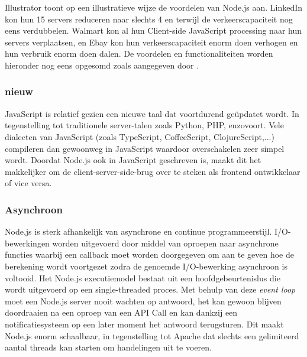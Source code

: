 Illustrator \textcite{Mehmet2016} toont op een illustratieve wijze de voordelen van Node.js aan. LinkedIn kon hun 15 servers reduceren naar slechts 4 en terwijl de verkeerscapaciteit nog eens verdubbelen. Walmart kon al hun Client-side JavaScript processing naar hun servers verplaatsen, en Ebay kon hun verkeerscapaciteit enorm doen verhogen en hun verbruik enorm doen dalen. De voordelen en functionaliteiten worden hieronder nog eens opgesomd zoals aangegeven door \textcite{Chandrayan2017}.

\subsubsection{nieuw}
\label{sec:new}

JavaScript is relatief gezien een nieuwe taal dat voortdurend geüpdatet wordt. In tegenstelling tot traditionele server-talen zoals Python, PHP, enzovoort. Vele dialecten van JavaScript (zoals TypeScript, CoffeeScript, ClojureScript,...) compileren dan gewoonweg in JavaScript waardoor overschakelen zeer simpel wordt. Doordat Node.js ook in JavaScript geschreven is, maakt dit het makkelijker om de client-server-side-brug over te steken als frontend ontwikkelaar of vice versa. \autocite{ExpressMozilla}

\subsubsection{Asynchroon}
\label{sec:async}

Node.js is sterk afhankelijk van asynchrone en continue programmeerstijl. I/O-bewerkingen worden uitgevoerd door middel van oproepen naar asynchrone functies waarbij een callback moet worden doorgegeven om aan te geven hoe de berekening wordt voortgezet zodra de genoemde I/O-bewerking asynchroon is voltooid. Het Node.js executiemodel bestaat uit een hoofdgebeurtenislus die wordt uitgevoerd op een single-threaded proces. Met behulp van deze \textit{event loop} moet een Node.js server nooit wachten op antwoord, het kan gewoon blijven doordraaien na een oproep van een API Call en kan dankzij een notificatiesysteem op een later moment het antwoord terugsturen. Dit maakt Node.js enorm schaalbaar, in tegenstelling tot Apache dat slechts een gelimiteerd aantal threads kan starten om handelingen uit te voeren.

